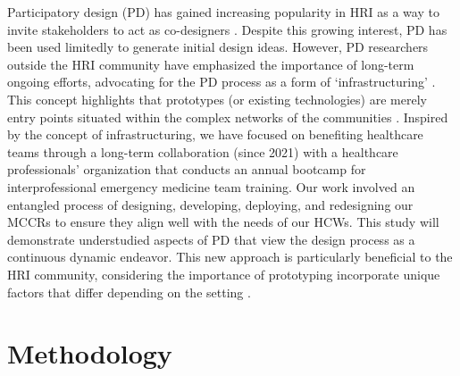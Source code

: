 Participatory design (PD) has gained increasing popularity in HRI as a way to invite stakeholders to act as co-designers \cite{lee2017steps, azenkot2016enabling, antony2023co}. %
Despite this growing interest, PD has been used limitedly to generate initial design ideas. 
However, PD researchers outside the HRI community have emphasized the importance of long-term ongoing efforts, advocating for the PD process as a form of `infrastructuring' \cite{bjorgvinsson2010participatory}. 
This concept highlights that prototypes (or existing technologies) are merely entry points situated within the complex networks of the communities \cite{suchman2002located, star1994steps}. %
Inspired by the concept of infrastructuring, we have focused on benefiting healthcare teams through a long-term collaboration (since 2021) with a healthcare professionals’ organization that conducts an annual bootcamp for interprofessional emergency medicine team training. 
Our work involved an entangled process of designing, developing, deploying, and redesigning our MCCRs to ensure they align well with the needs of our HCWs. This study will demonstrate understudied aspects of PD that view the design process as a continuous dynamic endeavor. 
This new approach is particularly beneficial to the HRI community, considering the importance of prototyping incorporate unique factors that differ depending on the setting \cite{lee2022configuring}.




%
\section{Methodology}
          
